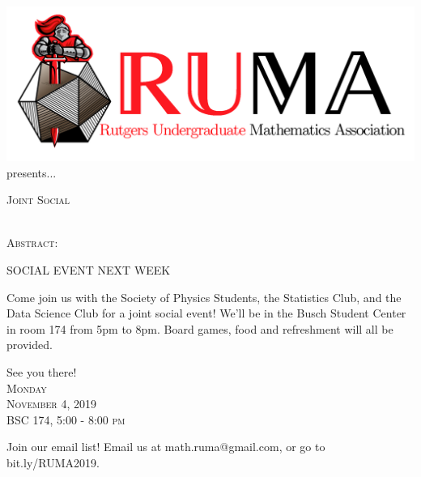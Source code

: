 \documentclass[12pt]{article}
\begin{document}

\begin{center}\includegraphics[scale=.55]{RUMAlogo.png}\\
  presents... \\

  \vspace{1mm}
\begin{spacing}{1}
{\fontsize{40}{44}\selectfont  \textsc{
Joint Social}} \end{spacing}
 
~~\\

\normalsize
\textsc{Abstract:}

\LARGE
SOCIAL EVENT NEXT WEEK

\vspace{2mm}
Come join us with the Society of Physics Students, the
Statistics Club, and the Data Science Club for a joint social
event! We'll be in the Busch Student Center in room 174 from 5pm
to 8pm. Board games, food and refreshment will all be provided.

\vspace{2mm}
See you there!
\\

\vspace{10mm} 
\Huge   \textsc{Monday\\November 4, 2019 \\BSC 174, 5:00 - 8:00
  pm}
\end{center}

\begin{center}
  \large  Join our email list! Email us at math.ruma@gmail.com, or
go to bit.ly/RUMA2019.\\
\end{center}
\end{document}
